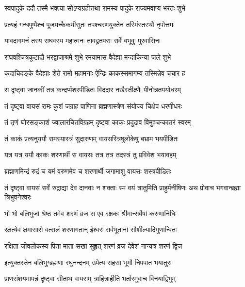 \twolineshloka
{स्वपादुके ददौ तस्मै भक्त्या सोऽप्यग्रहीत्तथा}
{रामस्य पादुके राज्यमवाप्य भरतः शुभे}%

\twolineshloka
{प्रत्यहं गन्धपुष्पैश्च पूजयन्कैकयीसुतः}
{तपश्चरणयुक्तेन तस्मिंस्तस्थौ नृपोत्तमः}%

\twolineshloka
{यावदागमनं तस्य राघवस्य महात्मनः}
{तावद्व्रतपराः सर्वे बभूवुः पुरवासिनः}%

\twolineshloka
{राघवश्चित्रकूटाद्रौ भरद्वाजाश्रमे शुभे}
{रमयामास वैदेह्या मन्दाकिन्या जले शुभे}%

\twolineshloka
{कदाचिदङ्के वैदेह्याः शेते रामो महामनाः}
{ऐन्द्रिः काकस्समागम्य तस्मिन्नेव चचार ह}%

\twolineshloka
{स दृष्ट्वा जानकीं तत्र कन्दर्प्पशरपीडितः}
{विददार नखैस्तीक्ष्णैः पीनोन्नतपयोधरम्}%

\twolineshloka
{तं दृष्ट्वा वायसं रामः कुशं जग्राह पाणिना}
{ब्रह्मणास्त्रेण संयोज्य चिक्षेप धरणीधरः}%

\twolineshloka
{तं तृणं घोरसङ्काशं ज्वालारचितविग्रहम्}
{दृष्ट्वा काकः प्रदुद्राव विमुञ्चन्कातरं स्वरम्}%

\twolineshloka
{तं काकं प्रत्यनुययौ रामस्यास्त्रं सुदारुणम्}
{वायसस्त्रिषुलोकेषु बभ्राम भयपीडितः}%

\twolineshloka
{यत्र यत्र ययौ काकः शरणार्थी स वायसः}
{तत्र तत्र तदस्त्रं तु प्रविवेश भयावहम्}%

\twolineshloka
{ब्रह्माणमिन्द्रं रुद्रं च यमं वरुणमेव च}
{शरणार्थी जगामाशु वायसः शस्त्रपीडितः}%


\threelineshloka
{तं दृष्ट्वा वायसं सर्वे रुद्राद्या देव दानवाः}
{न शक्ताः स्म वयं त्रातुमिति प्राहुर्मनीषिणः}
{अथ प्रोवाच भगवान्ब्रह्मा त्रिभुवनेश्वरः}%


\twolineshloka
{भो भो बलिभुजां श्रेष्ठ तमेव शरणं व्रज}
{स एव रक्षकः श्रीमान्सर्वेषां करुणानिधिः}%

\twolineshloka
{रक्षत्येव क्षमासारो वत्सलं शरणागतान्}
{ईश्वरः सर्वभूतानां सौशील्यादिगुणान्वितः}%

\twolineshloka
{रक्षिता जीवलोकस्य पिता माता सखा सुहृत्}
{शरणं व्रज देवेशं नान्यत्र शरणं द्विज}%


\twolineshloka
{इत्युक्तस्तेन बलिभुग्ब्रह्मणा रघुनन्दनम्}
{उपेत्य सहसा भूमौ निपपात भयातुरः}%

\twolineshloka
{प्राणसंशयमापन्नं दृष्ट्वा सीताथ वायसम्}
{त्राहित्राहीति भर्तारमुवाच विनयाद्विभुम्}%

